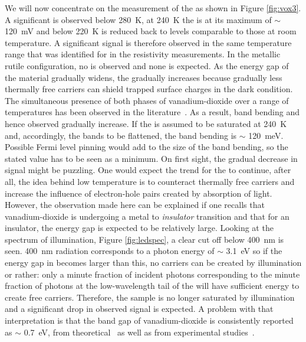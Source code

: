 We will now concentrate on the measurement of the \spv{} as shown in Figure \ref{fig:vox3}. A significant \spv{} is observed below \SI{280}{\kelvin}, at \SI{240}{\kelvin} the \spv{} is at its maximum of $\sim$ \SI{120}{\milli\volt} and below \SI{220}{\kelvin} \spv{} is reduced back to levels comparable to those at room temperature. A significant \spv{} signal is therefore observed in the same temperature range that was identified for \mit{} in the resistivity measurements. In the metallic rutile configuration, no \spv{} is observed and none is expected. As the energy gap of the material gradually widens, the \spv{} gradually increases because gradually less thermally free carriers can shield trapped surface charges in the dark condition. The simultaneous presence of both phases of vanadium-dioxide over a range of temperatures has been observed in the literature~\cite{pergament_mixphase}. As a result, band bending and hence observed \spv{} gradually increase. If the \spv{} is assumed to be saturated at \SI{240}{\kelvin} and, accordingly, the bands to be flattened, the band bending is $\sim$ \SI{120}{\milli\electronvolt}. Possible Fermi level pinning would add to the size of the band bending, so the stated value has to be seen as a minimum. On first sight, the gradual decrease in \spv{} signal might be puzzling. One would expect the trend for the \spv{} to continue, after all, the idea behind low temperature \spv{} is to counteract thermally free carriers and increase the influence of electron-hole pairs created by absorption of light. However, the observation made here can be explained if one recalls that vanadium-dioxide is undergoing a metal to \emph{insulator} transition and that for an insulator, the energy gap is expected to be relatively large. Looking at the spectrum of illumination, Figure \ref{fig:ledspec}, a clear cut off below \SI{400}{\nano\metre} is seen. \SI{400}{\nano\metre} radiation corresponds to a photon energy of $\sim$ \SI{3.1}{\electronvolt} so if the energy gap in \vadiox{} becomes larger than this, no carriers can be created by illumination or rather: only a minute fraction of incident photons corresponding to the minute fraction of photons at the low-wavelength tail of the \led{} will have sufficient energy to create free carriers. Therefore, the sample is no longer saturated by illumination and a significant drop in observed \spv{} signal is expected. A problem with that interpretation is that the band gap of vanadium-dioxide is consistently reported as $\sim$ \SI{0.7}{\electronvolt}, from theoretical~\cite{biermann_theogap} as well as from experimental studies~\cite{garcia_expgap,jensen_expgap,koethe_expstud,merenda_expgap}.\\
